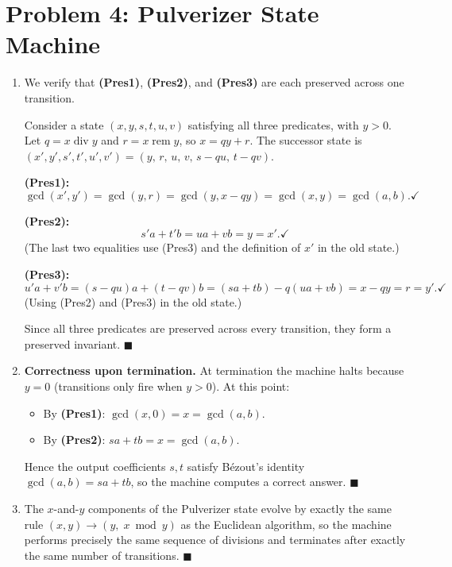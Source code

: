 \documentclass[11pt]{article}
\begin{document}
\section*{Problem 4: Pulverizer State Machine}
\begin{enumerate}[label=\textbf{(\alph*)}]

\item We verify that \textbf{(Pres1)}, \textbf{(Pres2)}, and \textbf{(Pres3)} are each preserved across one transition.

Consider a state $(x, y, s, t, u, v)$ satisfying all three predicates, with $y > 0$. Let $q = x \operatorname{div} y$ and $r = x \operatorname{rem} y$, so $x = qy + r$. The successor state is $(x', y', s', t', u', v') = (y,\, r,\, u,\, v,\, s-qu,\, t-qv)$.

\textbf{(Pres1):}
\[
\gcd(x', y') = \gcd(y, r) = \gcd(y, x - qy) = \gcd(x, y) = \gcd(a, b). \checkmark
\]

\textbf{(Pres2):}
\[
s'a + t'b = ua + vb = y = x'. \checkmark
\]
(The last two equalities use (Pres3) and the definition of $x'$ in the old state.)

\textbf{(Pres3):}
\[
u'a + v'b = (s - qu)a + (t - qv)b = (sa + tb) - q(ua + vb) = x - qy = r = y'. \checkmark
\]
(Using (Pres2) and (Pres3) in the old state.)

Since all three predicates are preserved across every transition, they form a preserved invariant. $\blacksquare$

\item \textbf{Correctness upon termination.} At termination the machine halts because $y = 0$ (transitions only fire when $y > 0$). At this point:
\begin{itemize}
    \item By \textbf{(Pres1)}: $\gcd(x, 0) = x = \gcd(a, b)$.
    \item By \textbf{(Pres2)}: $sa + tb = x = \gcd(a, b)$.
\end{itemize}
Hence the output coefficients $s, t$ satisfy B\'{e}zout's identity $\gcd(a,b) = sa + tb$, so the machine computes a correct answer. $\blacksquare$

\item The $x$-and-$y$ components of the Pulverizer state evolve by exactly the same rule $(x, y) \to (y,\; x \bmod y)$ as the Euclidean algorithm, so the machine performs precisely the same sequence of divisions and terminates after exactly the same number of transitions. $\blacksquare$

\end{enumerate}
\end{document}
